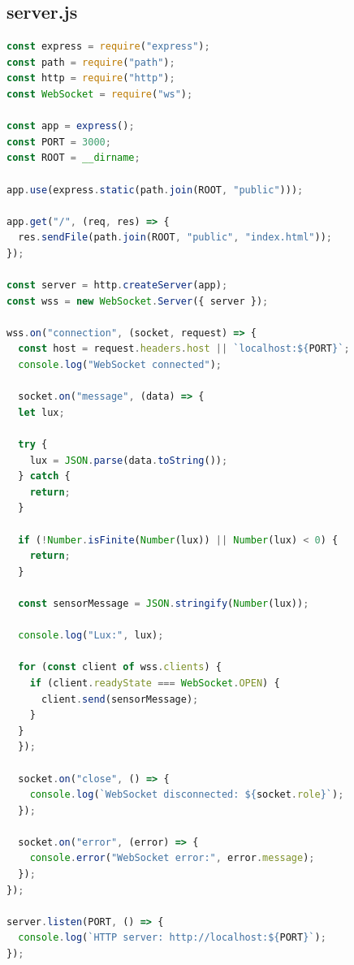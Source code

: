 \documentclass[11pt]{article}
\begin{document}
\subsection{server.js}
    \begin{lstlisting}[language=JavaScript]
const express = require("express");
const path = require("path");
const http = require("http");
const WebSocket = require("ws");

const app = express();
const PORT = 3000;
const ROOT = __dirname;

app.use(express.static(path.join(ROOT, "public")));

app.get("/", (req, res) => {
  res.sendFile(path.join(ROOT, "public", "index.html"));
});

const server = http.createServer(app);
const wss = new WebSocket.Server({ server });

wss.on("connection", (socket, request) => {
  const host = request.headers.host || `localhost:${PORT}`;
  console.log("WebSocket connected");

  socket.on("message", (data) => {
  let lux;

  try {
    lux = JSON.parse(data.toString());
  } catch {
    return;
  }

  if (!Number.isFinite(Number(lux)) || Number(lux) < 0) {
    return;
  }

  const sensorMessage = JSON.stringify(Number(lux));

  console.log("Lux:", lux);

  for (const client of wss.clients) {
    if (client.readyState === WebSocket.OPEN) {
      client.send(sensorMessage);
    }
  }
  });

  socket.on("close", () => {
    console.log(`WebSocket disconnected: ${socket.role}`);
  });

  socket.on("error", (error) => {
    console.error("WebSocket error:", error.message);
  });
});

server.listen(PORT, () => {
  console.log(`HTTP server: http://localhost:${PORT}`);
});

    \end{lstlisting}
\end{document}
